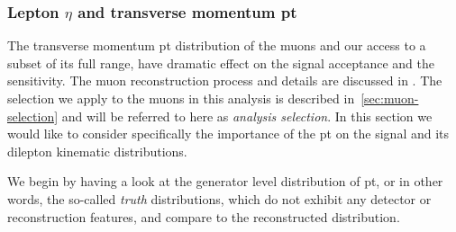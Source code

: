 \subsubsection{Lepton $\eta$ and transverse momentum \gls{pt}}
\label{sec:muon-eta-pt}

The transverse momentum \gls{pt} distribution of the muons and our access to a subset of its full range, have dramatic effect on the signal acceptance and the sensitivity. The muon reconstruction process and details are discussed in . The selection we apply to the muons in this analysis is described in~\ref{sec:muon-selection} and will be referred to here as \emph{analysis selection}. In this section we would like to consider specifically the importance of the \gls{pt} on the signal and its dilepton kinematic distributions.

We begin by having a look at the generator level distribution of \gls{pt}, or in other words, the so-called \emph{truth} distributions, which do not exhibit any detector or reconstruction features, and compare to the reconstructed distribution.

